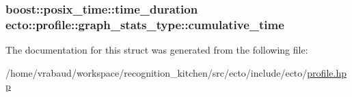 \subsubsection[{cumulative\+\_\+time}]{\setlength{\rightskip}{0pt plus 5cm}boost\+::posix\+\_\+time\+::time\+\_\+duration ecto\+::profile\+::graph\+\_\+stats\+\_\+type\+::cumulative\+\_\+time}\label{structecto_1_1profile_1_1graph__stats__type_a340d79ae72ca5639e55098c860640ba8}


The documentation for this struct was generated from the following file\+:\begin{DoxyCompactItemize}
\item 
/home/vrabaud/workspace/recognition\+\_\+kitchen/src/ecto/include/ecto/\hyperlink{profile_8hpp}{profile.\+hpp}\end{DoxyCompactItemize}
